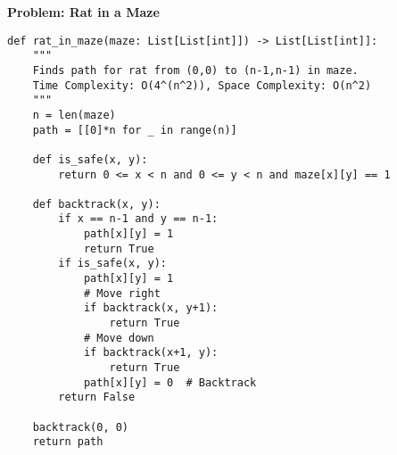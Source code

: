 % 
% 
\noindent\textbf{Problem: Rat in a Maze}
\begin{verbatim}
def rat_in_maze(maze: List[List[int]]) -> List[List[int]]:
    """
    Finds path for rat from (0,0) to (n-1,n-1) in maze.
    Time Complexity: O(4^(n^2)), Space Complexity: O(n^2)
    """
    n = len(maze)
    path = [[0]*n for _ in range(n)]
    
    def is_safe(x, y):
        return 0 <= x < n and 0 <= y < n and maze[x][y] == 1
    
    def backtrack(x, y):
        if x == n-1 and y == n-1:
            path[x][y] = 1
            return True
        if is_safe(x, y):
            path[x][y] = 1
            # Move right
            if backtrack(x, y+1):
                return True
            # Move down
            if backtrack(x+1, y):
                return True
            path[x][y] = 0  # Backtrack
        return False
        
    backtrack(0, 0)
    return path
\end{verbatim}

